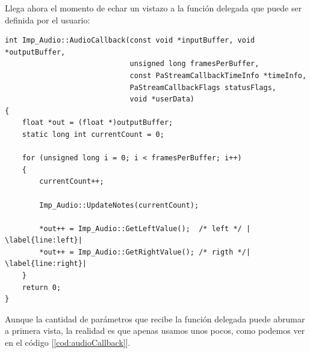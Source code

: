Llega ahora el momento de echar un vistazo a la función delegada que puede ser definida por el usuario:\\

\begin{lstlisting}[style=C-color, caption={Función delegada que pasamos a PortAudio},label=cod:audioCallback, escapechar=|]
int Imp_Audio::AudioCallback(const void *inputBuffer, void *outputBuffer,
                             unsigned long framesPerBuffer,
                             const PaStreamCallbackTimeInfo *timeInfo,
                             PaStreamCallbackFlags statusFlags,
                             void *userData)
{
    float *out = (float *)outputBuffer;
    static long int currentCount = 0;

    for (unsigned long i = 0; i < framesPerBuffer; i++)
    {
        currentCount++;

        Imp_Audio::UpdateNotes(currentCount);

        *out++ = Imp_Audio::GetLeftValue();  /* left */ | \label{line:left}|
        *out++ = Imp_Audio::GetRightValue(); /* rigth */| \label{line:right}|
    }
    return 0;
}
\end{lstlisting}

Aunque la cantidad de parámetros que recibe la función delegada puede abrumar a primera vista, la realidad es que apenas usamos unos pocos, como podemos ver en el código [\ref{cod:audioCallback}].\\

